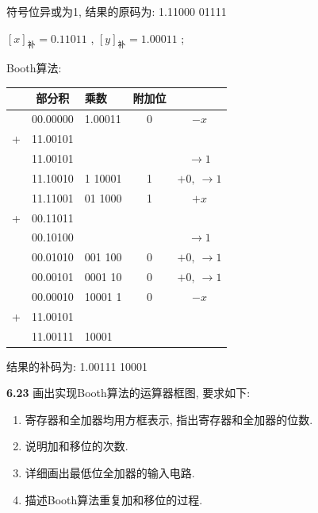 \documentclass[UTF8]{report}
\newcommand{\ra}{\rightarrow}
\newcommand{\cdclass}[2]{[#1]_{\text{#2}}}
\newcommand{\problem}[1]{{\setlength{\parskip}{10pt}\noindent \bf{#1}}}
\newenvironment{solution}{{\noindent\hskip 2em \bf 解 \quad}}{}
\begin{document}
\begin{solution}
\begin{enumerate}
        符号位异或为1, 结果的原码为: 1.11000 01111
        
        $\cdclass{x}{补}=  0.11011$ ,  $\cdclass{y}{补}= 1.00011$ ;

        Booth算法:
        \begin{tabular}{cc|l|c|c}
             & 部分积   & 乘数    & 附加位 & \\
            \hline
             & 00.00000 & 1.00011 & 0 & $-x$ \\
            +& 11.00101 &         &   &  \\
              \hline
             & 11.00101 &         &   & $\ra 1$ \\
             & 11.10010 & 1 10001 & 1 & $+0,\ \ra 1$ \\
             & 11.11001 & 01 1000 & 1 & $+x$ \\
            +& 00.11011 &         &   &  \\
              \hline
             & 00.10100 &         &   & $\ra 1$ \\
             & 00.01010 & 001 100 & 0 & $+0,\ \ra 1$ \\
             & 00.00101 & 0001 10 & 0 & $+0,\ \ra 1$ \\
             & 00.00010 & 10001 1 & 0 & $-x$ \\
            +& 11.00101 &         &   &  \\
              \hline
             & 11.00111 & 10001   &   & \\
        \end{tabular}

        结果的补码为: 1.00111 10001
    \end{enumerate}

\end{solution}


\problem{6.23} 画出实现Booth算法的运算器框图, 要求如下: 
\begin{enumerate}
    \item 寄存器和全加器均用方框表示, 指出寄存器和全加器的位数.
    \item 说明加和移位的次数.
    \item 详细画出最低位全加器的输入电路.
    \item 描述Booth算法重复加和移位的过程.
\end{enumerate}
\end{document}

